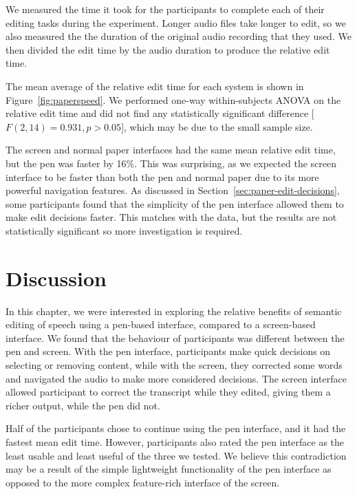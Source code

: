 We measured the time it took for the participants to complete each of their editing tasks during the experiment.
Longer audio files take longer to edit, so we also measured the the duration of the original audio recording that they
used. We then divided the edit time by the audio duration to produce the relative edit time.


The mean average of the relative edit time for each system is shown in Figure~\ref{fig:paperspeed}. We performed
one-way within-subjects ANOVA on the relative edit time and did not find any statistically significant difference
[$F(2,14) = 0.931, p > 0.05$], which may be due to the small sample size.

The screen and normal paper interfaces had the same mean relative edit time, but the pen was faster by 16\%.  This was
surprising, as we expected the screen interface to be faster than both the pen and normal paper due to its more
powerful navigation features. As discussed in Section~\ref{sec:paper-edit-decisions}, some participants found that the
simplicity of the pen interface allowed them to make edit decisions faster. This matches with the data, but the results
are not statistically significant so more investigation is required.

\section{Discussion}\label{sec:paper-discussion}

In this chapter, we were interested in exploring the relative benefits of semantic editing of speech using a pen-based 
interface, compared to a screen-based interface.
We found that the behaviour of participants was different between the pen and screen. With the pen interface,
participants make quick decisions on selecting or removing content, while with the screen, they corrected some words
and navigated the audio to make more considered decisions. The screen interface allowed participant to correct the
transcript while they edited, giving them a richer output, while the pen did not.

Half of the participants chose to continue using the pen interface, and it had the fastest mean edit time. However,
participants also rated the pen interface as the least usable and least useful of the three we tested. We believe this
contradiction may be a result of the simple lightweight functionality of the pen interface as opposed to the
more complex feature-rich interface of the screen.

